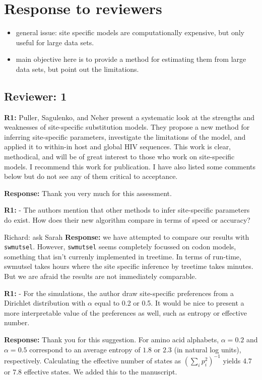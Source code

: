 \documentclass[aps,rmp,onecolumn]{revtex4-1}
\newcommand{\Richard}[1]{{\color{drab}Richard: #1}}
\newcommand{\refa}[1]{\textbf{R1:} #1}
\newcommand{\response}[1]{{\color{black}\textbf{Response:} #1}}
\begin{document}
\section*{Response to reviewers}

\begin{itemize}
    \item general issue: site specific models are computationally expensive, but only useful for large data sets.
    \item main objective here is to provide a method for estimating them from large data sets, but point out the limitations.
\end{itemize}


\subsection*{Reviewer: 1}

\refa{Puller, Sagulenko, and Neher present a systematic look at the strengths and weaknesses of site-specific substitution models. They propose a new method for inferring site-specific parameters, investigate the limitations of the model, and applied it to within-in host and global HIV sequences. This work is clear, methodical, and will be of great interest to those who work on site-specific models. I recommend this work for publication. I have also listed some comments below but do not see any of them critical to acceptance.}

\response{Thank you very much for this assessment.}

\refa{- The authors mention that other methods to infer site-specific parameters do exist. How does their new algorithm compare in terms of speed or accuracy?}

\Richard{ask Sarah}
\response{we have attempted to compare our results with
\texttt{swmutsel}. However, \texttt{swmutsel} seems completely focussed on codon models, something that isn't currenly implemented in treetime. In terms of run-time,
swmutsel takes hours where the site specific inference by treetime takes minutes.
But we are afraid the results are not immediately comparable. }


\refa{- For the simulations, the author draw site-specific preferences from a Dirichlet distribution with $\alpha$ equal to 0.2 or 0.5. It would be nice to present a more interpretable value of the preferences as well, such as entropy or effective number.}

\response{
Thank you for this suggestion.
For amino acid alphabets, $\alpha=0.2$ and $\alpha=0.5$ correspond to an average entropy of $1.8$ or $2.3$ (in natural log units), respectively.
Calculating the effective number of states as $\left(\sum_i p_i^2\right)^{-1}$ yields 4.7 or 7.8 effective states.
We added this to the manuscript.}
\end{document}
